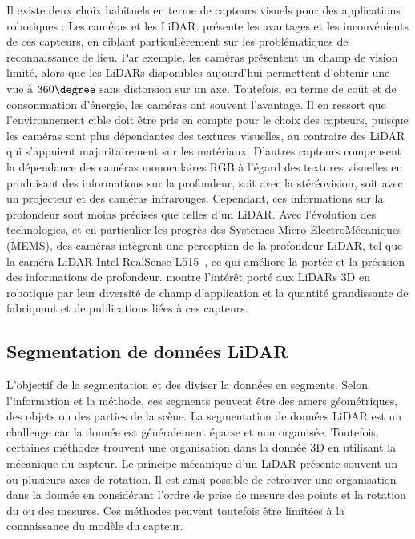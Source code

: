 \documentclass[a4paper, french, 10pt, onecolumn, notitlepage, roman]{article}
\begin{document}
Il existe deux choix habituels en terme de capteurs visuels pour des applications robotiques : Les caméras et les LiDAR.
\cite{barros::2021} présente les avantages et les inconvénients de ces capteurs, en ciblant particulièrement sur les problématiques de reconnaissance de lieu.
Par exemple, les caméras présentent un champ de vision limité, alors que les LiDARs disponibles aujourd'hui permettent d'obtenir une vue à $360\degree$ sans distorsion sur un axe.
Toutefois, en terme de coût et de consommation d'énergie, les caméras ont souvent l'avantage.
Il en ressort que l'environnement cible doit être pris en compte pour le choix des capteurs, puisque les caméras sont plus dépendantes des textures visuelles, au contraire des LiDAR qui s'appuient majoritairement sur les matériaux.
D'autres capteurs compensent la dépendance des caméras monoculaires RGB à l'égard des textures visuelles en produisant des informations sur la profondeur, soit avec la stéréovision, soit avec un projecteur et des caméras infrarouges.
Cependant, ces informations sur la profondeur sont moins précises que celles d'un LiDAR.
Avec l'évolution des technologies, et en particulier les progrès des Systèmes Micro-ElectroMécaniques (MEMS), des caméras intègrent une perception de la profondeur LiDAR, tel que la caméra LiDAR Intel RealSense L515~\cite{intel:l515:}, ce qui améliore la portée et la précision des informations de profondeur.
\cite{yang:arxiv:2022} montre l'intérêt porté aux LiDARs 3D en robotique par leur diversité de champ d'application et la quantité grandissante de fabriquant et de publications liées à ces capteurs.

\subsection{Segmentation de données LiDAR}
L'objectif de la segmentation et des diviser la données en segments.
Selon l'information et la méthode, ces segments peuvent être des amers géométriques, des objets ou des parties de la scène.
La segmentation de données LiDAR est un challenge car la donnée est généralement éparse et non organisée.
Toutefois, certaines méthodes trouvent une organisation dans la donnée 3D en utilisant la mécanique du capteur.
Le principe mécanique d'un LiDAR présente souvent un ou plusieurs axes de rotation.
Il est ainsi possible de retrouver une organisation dans la donnée en considérant l'ordre de prise de mesure des points et la rotation du ou des mesures.
Ces méthodes peuvent toutefois être limitées à la connaissance du modèle du capteur.
\end{document}
